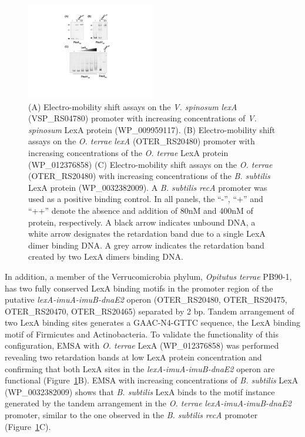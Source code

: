 \begin{figure}
  \centering
  \includegraphics[width=0.5\textwidth]{figures/chapter5/emsa1}
  \caption{(A) Electro-mobility shift assays on the \textit{V. spinosum}
    \textit{lexA} (VSP\_RS04780) promoter with increasing concentrations of
    \textit{V. spinosum} LexA protein (WP\_009959117). (B) Electro-mobility
    shift assays on the \textit{O. terrae} \textit{lexA} (OTER\_RS20480)
    promoter with increasing concentrations of the \textit{O. terrae} LexA
    protein (WP\_012376858) (C) Electro-mobility shift assays on the
    \textit{O. terrae} (OTER\_RS20480) with increasing concentrations of the
    \textit{B. subtilis} LexA protein (WP\_0032382009). A \textit{B. subtilis}
    \textit{recA} promoter was used as a positive binding control.  In all
    panels, the ``-'', ``+'' and ``++'' denote the absence and addition of 80nM
    and 400nM of protein, respectively. A black arrow indicates unbound DNA, a
    white arrow designates the retardation band due to a single LexA dimer
    binding DNA\@. A grey arrow indicates the retardation band created by two
    LexA dimers binding DNA.}
  \label{fig:emsa1}
\end{figure}


In addition, a member of the Verrucomicrobia phylum, \textit{Opitutus terrae}
PB90-1, has two fully conserved LexA binding motifs in the promoter region of
the putative \textit{lexA-imuA-imuB-dnaE2} operon (OTER\_RS20480,
OTER\_RS20475, OTER\_RS20470, OTER\_RS20465) separated by 2 bp. Tandem
arrangement of two LexA binding sites generates a GAAC-N4-GTTC sequence,
the LexA binding motif of Firmicutes and Actinobacteria. To validate the
functionality of this configuration, EMSA with \textit{O. terrae} LexA
(WP\_012376858) was performed revealing two retardation bands at low LexA
protein concentration and confirming that both LexA sites in the
\textit{lexA-imuA-imuB-dnaE2} operon are functional
(Figure~\ref{fig:emsa1}B). EMSA with increasing concentrations of
\textit{B. subtilis} LexA (WP\_0032382009) shows that \textit{B. subtilis} LexA
binds to the motif instance generated by the tandem arrangement in the
\textit{O. terrae} \textit{lexA-imuA-imuB-dnaE2} promoter, similar to the one
observed in the \textit{B. subtilis} \textit{recA} promoter
(Figure~\ref{fig:emsa1}C).

